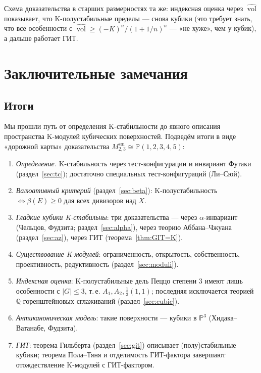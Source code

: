 \documentclass[11pt,a4paper]{article}
\theoremstyle{plain}
\theoremstyle{definition}
\theoremstyle{remark}
\newcommand{\Q}{\mathbb{Q}}
\newcommand{\PP}{\mathbb{P}}
\DeclareMathOperator{\vol}{vol}
\newcommand{\hvol}{\widehat{\vol}}
\newcommand{\sm}{\mathrm{sm}}
\begin{document}
Схема доказательства в старших размерностях та же: индексная оценка через $\hvol$ показывает, что
K-полустабильные пределы --- снова кубики (это требует знать, что все особенности с
$\hvol\ge(-K)^n/(1+1/n)^n$ --- «не хуже», чем у кубик), а дальше работает ГИТ.

\section{Заключительные замечания}\label{sec:concl}

\subsection{Итоги}

Мы прошли путь от определения K-стабильности до явного описания пространства K-модулей кубических
поверхностей. Подведём итоги в виде «дорожной карты» доказательства $M^{\sm}_{2,3}\cong\PP(1,2,3,4,5)$:
\begin{enumerate}
\item \emph{Определение.} K-стабильность через тест-конфигурации и инвариант Футаки
(раздел~\ref{sec:tc}); достаточно специальных тест-конфигураций (Ли--Сюй).
\item \emph{Валюативный критерий} (раздел~\ref{sec:beta}): K-полустабильность $\iff\beta(E)\ge0$
для всех дивизоров над $X$.
\item \emph{Гладкие кубики K-стабильны}: три доказательства --- через $\alpha$-инвариант
(Чельцов, Фудзита; раздел~\ref{sec:alpha}), через теорию Аббана--Чжуана (раздел~\ref{sec:az}),
через ГИТ (теорема~\ref{thm:GIT=K}).
\item \emph{Существование K-модулей}: ограниченность, открытость, собственность, проективность,
редуктивность (раздел~\ref{sec:moduli}).
\item \emph{Индексная оценка}: K-полустабильные дель Пеццо степени 3 имеют лишь особенности с
$|G|\le3$, т.\,е. $A_1,A_2,\frac13(1,1)$; последняя исключается теорией $\Q$-горенштейновых
сглаживаний (раздел~\ref{sec:cubic}).
\item \emph{Антиканоническая модель}: такие поверхности --- кубики в $\PP^3$ (Хидака--Ватанабе,
Фудзита).
\item \emph{ГИТ}: теорема Гильберта (раздел~\ref{sec:git}) описывает (полу)стабильные кубики;
теорема Пола--Тяня и отделимость ГИТ-фактора завершают отождествление K-модулей с ГИТ-фактором.
\end{enumerate}
\end{document}
